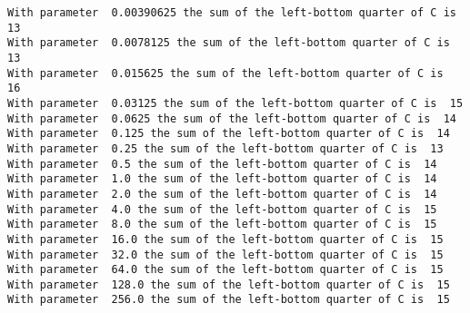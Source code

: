 \documentclass[10pt,a4paper]{article}
\theoremstyle{break}
\begin{document}
\begin{verbatim}
With parameter  0.00390625 the sum of the left-bottom quarter of C is  13
With parameter  0.0078125 the sum of the left-bottom quarter of C is  13
With parameter  0.015625 the sum of the left-bottom quarter of C is  16
With parameter  0.03125 the sum of the left-bottom quarter of C is  15
With parameter  0.0625 the sum of the left-bottom quarter of C is  14
With parameter  0.125 the sum of the left-bottom quarter of C is  14
With parameter  0.25 the sum of the left-bottom quarter of C is  13
With parameter  0.5 the sum of the left-bottom quarter of C is  14
With parameter  1.0 the sum of the left-bottom quarter of C is  14
With parameter  2.0 the sum of the left-bottom quarter of C is  14
With parameter  4.0 the sum of the left-bottom quarter of C is  15
With parameter  8.0 the sum of the left-bottom quarter of C is  15
With parameter  16.0 the sum of the left-bottom quarter of C is  15
With parameter  32.0 the sum of the left-bottom quarter of C is  15
With parameter  64.0 the sum of the left-bottom quarter of C is  15
With parameter  128.0 the sum of the left-bottom quarter of C is  15
With parameter  256.0 the sum of the left-bottom quarter of C is  15
\end{verbatim}
\end{document}
